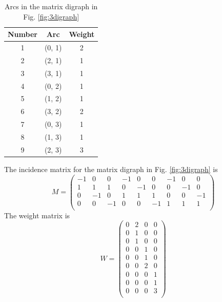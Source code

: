 \documentclass{article}
\begin{document}
\begin{table}
\begin{center}
    \begin{tabular}{ |c | c | c | }
        \hline
            Number & Arc & Weight\\
            \hline
            1 & (0, 1) & 2 \\
            2 & (2, 1) & 1 \\
            3 & (3, 1) & 1 \\
            4 & (0, 2) & 1 \\
            5 & (1, 2) & 1 \\
            6 & (3, 2) & 2 \\
            7 & (0, 3) & 1 \\
            8 & (1, 3) & 1 \\
            9 & (2, 3) & 3 \\
        \hline
    \end{tabular}
    \caption{\label{tab:arcs}Arcs in the matrix digraph in Fig. \ref{fig:3digraph}}        
\end{center}
\end{table}
The incidence matrix for the matrix digraph in Fig. \ref{fig:3digraph} is
\begin{equation}
    M = \begin{pmatrix}
-1 & 0 & 0 & -1 & 0 & 0 & -1 & 0 & 0\\
1 & 1 & 1 & 0 & -1 & 0 & 0 & -1 & 0\\
0 & -1 & 0 & 1 & 1 & 1 & 0 & 0 & -1\\
0 & 0 & -1 & 0 & 0 & -1 & 1 & 1 & 1\\
\end{pmatrix}
\label{eq:M}
\end{equation}
The weight matrix is
\begin{equation}
    W = \begin{pmatrix}
0 & 2 & 0 & 0\\
0 & 1 & 0 & 0\\
0 & 1 & 0 & 0\\
0 & 0 & 1 & 0\\
0 & 0 & 1 & 0\\
0 & 0 & 2 & 0\\
0 & 0 & 0 & 1\\
0 & 0 & 0 & 1\\
0 & 0 & 0 & 3\\
\end{pmatrix}
\label{eq:W}
\end{equation}
\end{document}
